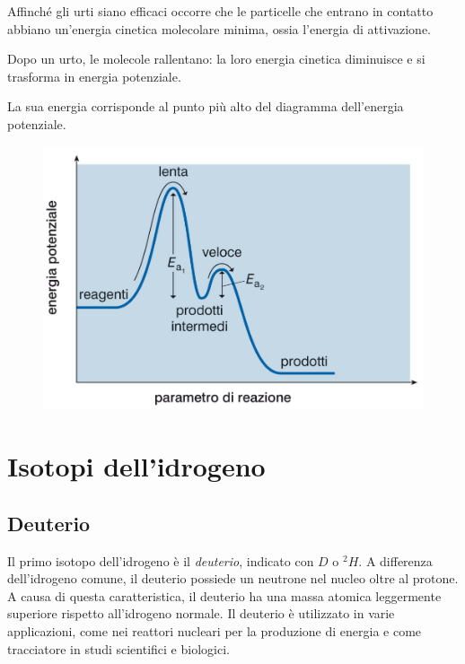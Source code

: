 \documentclass[a4paper]{article}
\begin{document}
Affinché gli urti siano efficaci occorre che le particelle che
entrano in contatto abbiano un'energia cinetica molecolare
minima, ossia l'energia di attivazione.

Dopo un urto, le molecole rallentano: la loro energia
cinetica diminuisce e si trasforma in energia potenziale.

\pagebreak


La sua energia corrisponde al punto più alto del diagramma dell'energia potenziale.

\begin{center}
\begin{figure}[th]
    \centering
    \includegraphics[width=\textwidth]{./reaction.png}
\end{figure}
\end{center}

\pagebreak

\section{Isotopi dell'idrogeno}

\subsection{Deuterio}

Il primo isotopo dell'idrogeno è il \textit{deuterio}, indicato con \(D\) o \(^2H\).
A differenza dell'idrogeno comune, il deuterio possiede un neutrone nel nucleo oltre al protone.
A causa di questa caratteristica, il deuterio ha una massa atomica leggermente superiore rispetto all'idrogeno normale.
Il deuterio è utilizzato in varie applicazioni, come nei reattori nucleari per la produzione di energia e come tracciatore in studi scientifici e biologici. 
\end{document}
